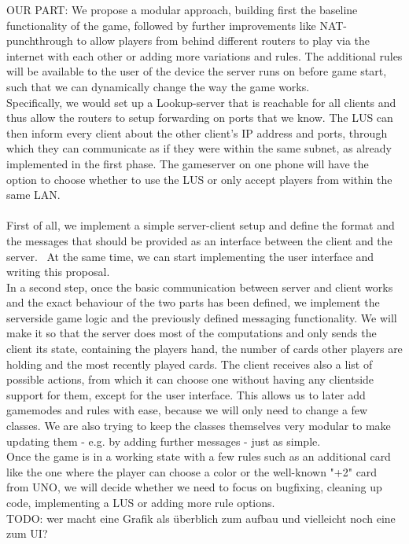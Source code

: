 \documentclass{report}
\begin{document}
OUR PART:
We propose a modular approach, building first the baseline functionality of the game, followed by further improvements like NAT-punchthrough to allow players from behind different routers to play via the internet with each other or adding more variations and rules. The additional rules will be available to the user of the device the server runs on before game start, such that we can dynamically change the way the game works.\\
Specifically, we would set up a Lookup-server that is reachable for all clients and thus allow the routers to setup forwarding on ports that we know. The LUS can then inform every client about the other client's IP address and ports, through which they can communicate as if they were within the same subnet, as already implemented in the first phase. The gameserver on one phone will have the option to choose whether to use the LUS or only accept players from within the same LAN.\\
\\
First of all, we implement a simple server-client setup and define the format and the messages that should be provided as an interface between the client and the server.~\cite{messaging} At the same time, we can start implementing the user interface and writing this proposal.\\
In a second step, once the basic communication between server and client works and the exact behaviour of the two parts has been defined, we implement the serverside game logic and the previously defined messaging functionality.
We will make it so that the server does most of the computations and only sends the client its state, containing the players hand, the number of cards other players are holding and the most recently played cards. The client receives also a list of possible actions, from which it can choose one without having any clientside support for them, except for the user interface. This allows us to later add gamemodes and rules with ease, because we will only need to change a few classes.
We are also trying to keep the classes themselves very modular to make updating them - e.g. by adding further messages - just as simple.\\
Once the game is in a working state with a few rules such as an additional card like the one where the player can choose a color or the well-known "+2" card from UNO, we will decide whether we need to focus on bugfixing, cleaning up code, implementing a LUS or adding more rule options.\\
\newline
\newline
TODO: wer macht eine Grafik als überblich zum aufbau und vielleicht noch eine zum UI?
\end{document}

